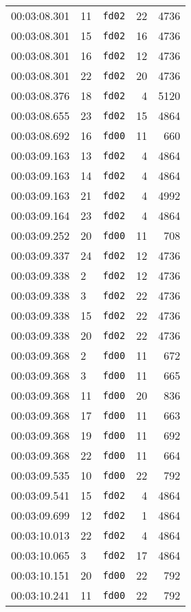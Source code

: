 \documentclass{article}
\begin{document}
\begin{longtable}{lllrr}
00:03:08.301 & 11 & \texttt{fd02} & 22 & 4736 \\
00:03:08.301 & 15 & \texttt{fd02} & 16 & 4736 \\
00:03:08.301 & 16 & \texttt{fd02} & 12 & 4736 \\
00:03:08.301 & 22 & \texttt{fd02} & 20 & 4736 \\
00:03:08.376 & 18 & \texttt{fd02} & 4 & 5120 \\
00:03:08.655 & 23 & \texttt{fd02} & 15 & 4864 \\
00:03:08.692 & 16 & \texttt{fd00} & 11 & 660 \\
00:03:09.163 & 13 & \texttt{fd02} & 4 & 4864 \\
00:03:09.163 & 14 & \texttt{fd02} & 4 & 4864 \\
00:03:09.163 & 21 & \texttt{fd02} & 4 & 4992 \\
00:03:09.164 & 23 & \texttt{fd02} & 4 & 4864 \\
00:03:09.252 & 20 & \texttt{fd00} & 11 & 708 \\
00:03:09.337 & 24 & \texttt{fd02} & 12 & 4736 \\
00:03:09.338 & 2 & \texttt{fd02} & 12 & 4736 \\
00:03:09.338 & 3 & \texttt{fd02} & 22 & 4736 \\
00:03:09.338 & 15 & \texttt{fd02} & 22 & 4736 \\
00:03:09.338 & 20 & \texttt{fd02} & 22 & 4736 \\
00:03:09.368 & 2 & \texttt{fd00} & 11 & 672 \\
00:03:09.368 & 3 & \texttt{fd00} & 11 & 665 \\
00:03:09.368 & 11 & \texttt{fd00} & 20 & 836 \\
00:03:09.368 & 17 & \texttt{fd00} & 11 & 663 \\
00:03:09.368 & 19 & \texttt{fd00} & 11 & 692 \\
00:03:09.368 & 22 & \texttt{fd00} & 11 & 664 \\
00:03:09.535 & 10 & \texttt{fd00} & 22 & 792 \\
00:03:09.541 & 15 & \texttt{fd02} & 4 & 4864 \\
00:03:09.699 & 12 & \texttt{fd02} & 1 & 4864 \\
00:03:10.013 & 22 & \texttt{fd02} & 4 & 4864 \\
00:03:10.065 & 3 & \texttt{fd02} & 17 & 4864 \\
00:03:10.151 & 20 & \texttt{fd00} & 22 & 792 \\
00:03:10.241 & 11 & \texttt{fd00} & 22 & 792 \\

\end{longtable}
\end{document}
